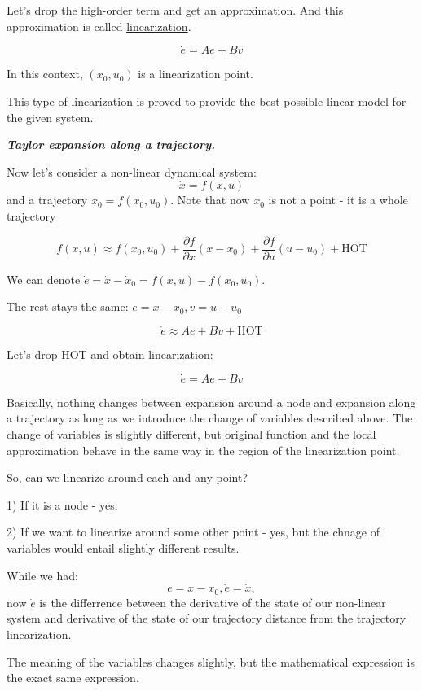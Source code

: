 Let's drop the high-order term and get an approximation. And this approximation is called \underline{linearization}. 


\[\dot e = Ae + Bv\]

In this context, $(x_0, u_0)$ is a linearization point. 

This type of linearization is proved to provide the best possible linear model for the given system.

\begin{center}
    \textit{\textbf{Taylor expansion along a trajectory.}}
\end{center}

Now let's consider a non-linear dynamical system:
\[\dot x = f(x, u)\] and a trajectory $x_0 = f(x_0, u_0)$. Note that now $x_0$ is not a point - it is a whole trajectory


\[
    f(x, u) \approx f(x_0, u_0) + \frac{\partial f}{\partial x} (x-x_0) + \frac{\partial f}{\partial u} (u-u_0) + \text{HOT}
\]

We can denote $\dot e = \dot x - \dot x_0 = f(x, u) - f(x_0, u_0)$. 

The rest stays the same: $e = x - x_0, v = u - u_0$

\[
    \dot e \approx A e + B v + \text{HOT}
\]

Let's drop HOT and obtain linearization:

\[
    \dot e = A e + B v 
\]



Basically, nothing changes between expansion around a node and expansion along a trajectory as long as we introduce the change of variables described above. 
The change of variables is slightly different, but original function and the local approximation behave in the same way in the region of the linearization point.


So, can we linearize around each and any point?

1) If it is a node - yes. 

2) If we want to linearize around some other point - yes, but the chnage of variables would entail slightly 
different results. 

While we had:
\[ e = x - x_0, \dot e = \dot x,\] now
$\dot e$ is the differrence between the derivative of the state of our non-linear system and derivative of the state of our trajectory distance from the trajectory linearization.  

The meaning of the variables changes slightly, but the mathematical expression is the exact same expression. 


